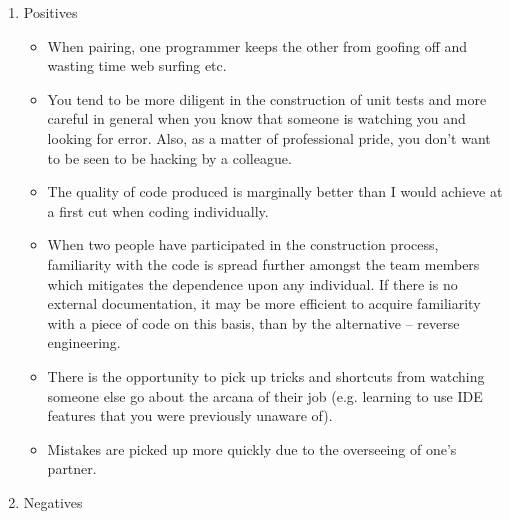 \documentclass{article}
\begin{document}
\begin{enumerate}
\item Positives
\label{sec:orgheadline211}

\begin{itemize}
\item When pairing, one programmer keeps the other from goofing off and
wasting time web surfing etc.\\
\item You tend to be more diligent in the construction of unit tests and
more careful in general when you know that someone is watching you
and looking for error. Also, as a matter of professional pride, you
don't want to be seen to be hacking by a colleague.\\
\item The quality of code produced is marginally better than I would
achieve at a first cut when coding individually.\\
\item When two people have participated in the construction process,
familiarity with the code is spread further amongst the team members
which mitigates the dependence upon any individual. If there is no
external documentation, it may be more efficient to acquire
familiarity with a piece of code on this basis, than by the
alternative -- reverse engineering.\\
\item There is the opportunity to pick up tricks and shortcuts from
watching someone else go about the arcana of their job (e.g. learning
to use IDE features that you were previously unaware of).\\
\item Mistakes are picked up more quickly due to the overseeing of one's
partner.
\end{itemize}

\item Negatives
\label{sec:orgheadline212}


\end{enumerate}
\end{document}
